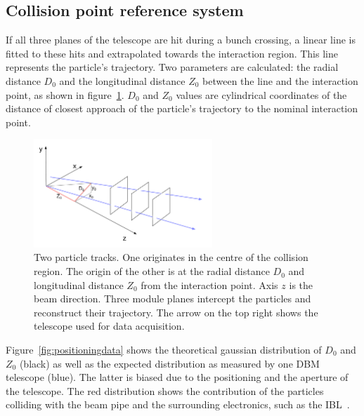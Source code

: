 \subsection{Collision point reference system}
If all three planes of the telescope are hit during a bunch crossing, a linear line is fitted to these hits and extrapolated towards the interaction region. This line represents the particle's trajectory. Two parameters are calculated: the radial distance $D_\mathrm{0}$ and the longitudinal distance $Z_\mathrm{0}$ between the line and the interaction point, as shown in figure~\ref{fig:z-r-distance}. $D_\mathrm{0}$ and $Z_\mathrm{0}$ values are cylindrical coordinates of the distance of closest approach  of the particle's trajectory to the nominal interaction point.
\begin{figure}[!t]
\centering
\includegraphics[width=0.6\textwidth]{../scripts/04_charge_monitoring/plots/z-r-distance2}
\caption{Two particle tracks. One originates in the centre of the collision region. The origin of the other is at the radial distance $D_\mathrm{0}$ and longitudinal distance $Z_\mathrm{0}$ from the interaction point. Axis $z$ is the beam direction. Three module planes intercept the particles and reconstruct their trajectory. The arrow on the top right shows the telescope used for data acquisition.}
\label{fig:z-r-distance}
\end{figure}
Figure~\ref{fig:positioningdata} shows the theoretical gaussian distribution of $D_\mathrm{0}$ and $Z_\mathrm{0}$ (black) as well as the expected distribution as measured by one DBM telescope (blue). The latter is biased due to the positioning and the aperture of the telescope. The red distribution shows the contribution of the particles colliding with the beam pipe and the surrounding electronics, such as the IBL~\cite{Capeans:1291633}.



